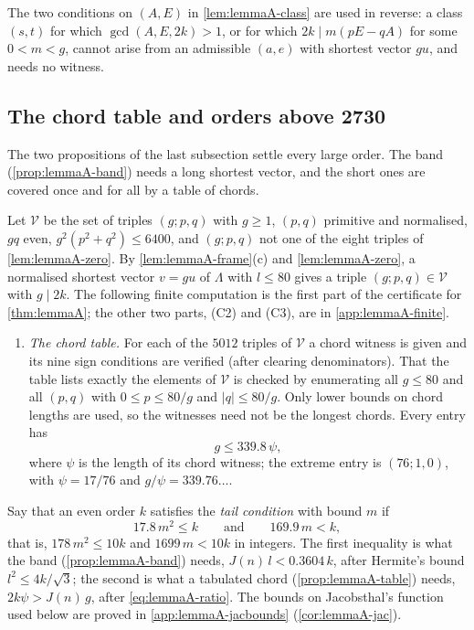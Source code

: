 The two conditions on $(A,E)$ in \autoref{lem:lemmaA-class} are used in
reverse: a class $(s,t)$ for which $\gcd(A,E,2k)>1$, or for which
$2k\mid m(pE-qA)$ for some $0<m<g$, cannot arise from an admissible
$(a,e)$ with shortest vector $gu$, and needs no witness.

\subsection{The chord table and orders above 2730}
\label{sec:lemmaA-tail}

The two propositions of the last subsection settle every large order. The band
(\autoref{prop:lemmaA-band}) needs a long shortest vector, and the short ones
are covered once and for all by a table of chords.

Let $\mathcal V$ be the set of triples $(g;p,q)$ with $g\ge1$, $(p,q)$
primitive and normalised, $gq$ even, $g^2(p^2+q^2)\le6400$, and $(g;p,q)$
not one of the eight triples of \autoref{lem:lemmaA-zero}. By
\autoref{lem:lemmaA-frame}(c) and \autoref{lem:lemmaA-zero}, a normalised
shortest vector $v=gu$ of $\Lambda$ with $l\le80$ gives a triple
$(g;p,q)\in\mathcal V$ with $g\mid2k$. The following finite computation is
the first part of the certificate for \autoref{thm:lemmaA};
the other two parts, (C2) and (C3), are in \autoref{app:lemmaA-finite}.
\begin{enumerate}
\item[(C1)] \emph{The chord table.} For each of the $5012$ triples of
$\mathcal V$ a chord witness is given and its nine sign conditions are
verified (after clearing denominators). That the table lists exactly the
elements of $\mathcal V$ is checked by enumerating all $g\le80$ and all
$(p,q)$ with $0\le p\le80/g$ and $|q|\le80/g$. Only lower bounds on chord
lengths are used, so the witnesses need not be the longest chords. Every entry has
\begin{equation}
g\le339.8\,\psi,
\label{eq:lemmaA-ratio}
\end{equation}
where $\psi$ is the length of its chord witness; the extreme entry is
$(76;1,0)$, with $\psi=17/76$ and $g/\psi=339.76\ldots$.
\end{enumerate}

Say that an even order $k$ satisfies the \emph{tail condition} with bound $m$ if
\begin{equation}
17.8\,m^2\le k\qquad\text{and}\qquad169.9\,m<k ,
\label{eq:lemmaA-tailcond}
\end{equation}
that is, $178\,m^2\le10k$ and $1699\,m<10k$ in integers. The first inequality
is what the band (\autoref{prop:lemmaA-band}) needs, $J(n)\,l<0.3604\,k$,
after Hermite's bound $l^2\le4k/\sqrt3$; the second is what a tabulated chord
(\autoref{prop:lemmaA-table}) needs, $2k\psi>J(n)\,g$, after
\eqref{eq:lemmaA-ratio}. The bounds on Jacobsthal's function used below are
proved in \autoref{app:lemmaA-jacbounds} (\autoref{cor:lemmaA-jac}).


